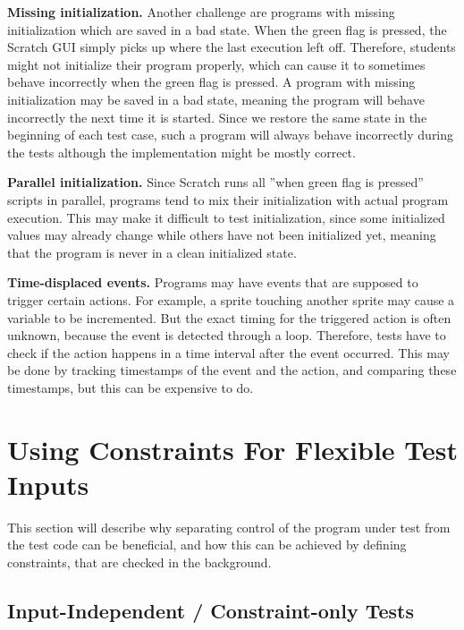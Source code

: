 \textbf{Missing initialization.}
Another challenge are programs with missing initialization which are saved in a bad state.
When the green flag is pressed, the Scratch GUI simply picks up where the last execution left off.
Therefore, students might not initialize their program properly,
which can cause it to sometimes behave incorrectly when the green flag is pressed.
A program with missing initialization may be saved in a bad state,
meaning the program will behave incorrectly the next time it is started.
Since we restore the same state in the beginning of each test case,
such a program will always behave incorrectly during the tests although the implementation might be mostly correct.
\parspace

\textbf{Parallel initialization.}
Since Scratch runs all ''when green flag is pressed'' scripts in parallel,
programs tend to mix their initialization with actual program execution.
This may make it difficult to test initialization,
since some initialized values may already change while others have not been initialized yet,
meaning that the program is never in a clean initialized state.
\parspace

\textbf{Time-displaced events.}
Programs may have events that are supposed to trigger certain actions.
For example, a sprite touching another sprite may cause a variable to be incremented.
But the exact timing for the triggered action is often unknown, because the event is detected through a loop.
Therefore, tests have to check if the action happens in a time interval after the event occurred.
This may be done by tracking timestamps of the event and the action, and comparing these timestamps,
but this can be expensive to do.
\parspace

\chapter{Using Constraints For Flexible Test Inputs}
\label{cha:using_constraints_for_flexible_test_inputs}

This section will describe why separating control of the program under test from the test code can be beneficial,
and how this can be achieved by defining constraints, that are checked in the background.

\section{Input-Independent / Constraint-only Tests}
\label{sec:input_independent_constraint_only_tests}

